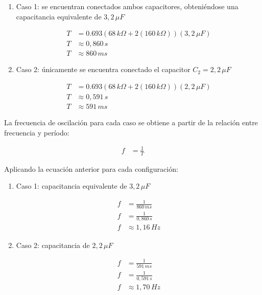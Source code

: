 \documentclass[journal, onecolumn]{IEEEtran}
\begin{document}
\begin{enumerate}

\item Caso 1: se encuentran conectados ambos capacitores,
obteniéndose una capacitancia equivalente de
$3{,}2\,\mu F$

\begin{align*}
T &= 0.693\left(68\,k\Omega + 2(160\,k\Omega)\right)
(3{,}2\,\mu F)\\
T &\approx 0{,}860\,s\\
T &\approx 860\,ms
\end{align*}

\item Caso 2: únicamente se encuentra conectado el capacitor
$C_2 = 2{,}2\,\mu F$

\begin{align*}
T &= 0.693\left(68\,k\Omega + 2(160\,k\Omega)\right)
(2{,}2\,\mu F)\\
T &\approx 0{,}591\,s\\
T &\approx 591\,ms
\end{align*}

\end{enumerate}

La frecuencia de oscilación para cada caso se obtiene a partir de la relación entre frecuencia y período:

\begin{align}
f &= \frac{1}{T}
\label{eq:frecuencia}
\end{align}

Aplicando la ecuación anterior para cada configuración:

\begin{enumerate}

\item Caso 1: capacitancia equivalente de $3{,}2\,\mu F$

\begin{align*}
f &= \frac{1}{860\,ms}\\
f &= \frac{1}{0{,}860\,s}\\
f &\approx 1{,}16\,Hz
\end{align*}

\item Caso 2: capacitancia de $2{,}2\,\mu F$

\begin{align*}
f &= \frac{1}{591\,ms}\\
f &= \frac{1}{0{,}591\,s}\\
f &\approx 1{,}70\,Hz
\end{align*}

\end{enumerate}
\end{document}
